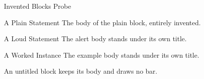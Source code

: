 \documentclass{slides}
\begin{document}
\begin{frame}{Invented Blocks Probe}
\begin{block}{A Plain Statement}
The body of the plain block, entirely invented.
\end{block}
\begin{alertblock}{A Loud Statement}
The alert body stands under its own title.
\end{alertblock}
\begin{exampleblock}{A Worked Instance}
The example body stands under its own title.
\end{exampleblock}
\begin{block}{}
An untitled block keeps its body and draws no bar.
\end{block}
\end{frame}
\end{document}

